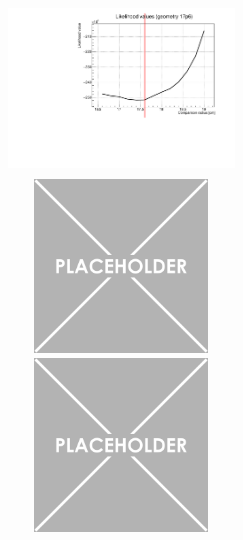 \documentclass[a4paper, 11pt]{report}
\begin{document}
\begin{figure}[htbp]
\begin{minipage}[b]{.32\textwidth}
\includegraphics[width=6cm, height=4.6cm]{figs/likelihood250LowStat/likelihood17p6.pdf}
\end{minipage}\hfill
\begin{minipage}[b]{.32\textwidth}
\includegraphics[width=6cm, height=4.6cm]{figs/placeholder.png}
\end{minipage} \hfill
\begin{minipage}[b]{.32\textwidth}
\includegraphics[width=6cm, height=4.6cm]{figs/placeholder.png}
\end{minipage} \hfill \vspace{10pt}


\end{figure}
\end{document}
